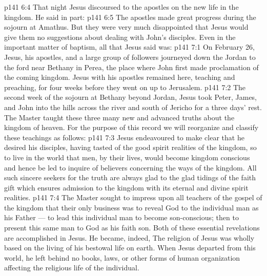 \vs p141 6:4 \pc That night Jesus discoursed to the apostles on the new life in the kingdom. He said in part: 
\vs p141 6:5 The apostles made great progress during the sojourn at Amathus. But they were very much disappointed that Jesus would give them no suggestions about dealing with John’s disciples. Even in the important matter of baptism, all that Jesus said was: 
\vs p141 7:1 On February 26, Jesus, his apostles, and a large group of followers journeyed down the Jordan to the ford near Bethany in Perea, the place where John first made proclamation of the coming kingdom. Jesus with his apostles remained here, teaching and preaching, for four weeks before they went on up to Jerusalem.
\vs p141 7:2 The second week of the sojourn at Bethany beyond Jordan, Jesus took Peter, James, and John into the hills across the river and south of Jericho for a three days’ rest. The Master taught these three many new and advanced truths about the kingdom of heaven. For the purpose of this record we will reorganize and classify these teachings as follows:
\vs p141 7:3 \pc Jesus endeavoured to make clear that he desired his disciples, having tasted of the good spirit realities of the kingdom, so to live in the world that men, by  their lives, would become kingdom conscious and hence be led to inquire of believers concerning the ways of the kingdom. All such sincere seekers for the truth are always glad to  the glad tidings of the faith gift which ensures admission to the kingdom with its eternal and divine spirit realities.
\vs p141 7:4 The Master sought to impress upon all teachers of the gospel of the kingdom that their only business was to reveal God to the individual man as his Father --- to lead this individual man to become son\hyp{}conscious; then to present this same man to God as his faith son. Both of these essential revelations are accomplished in Jesus. He became, indeed,  The religion of Jesus was wholly based on the living of his bestowal life on earth. When Jesus departed from this world, he left behind no books, laws, or other forms of human organization affecting the religious life of the individual.
